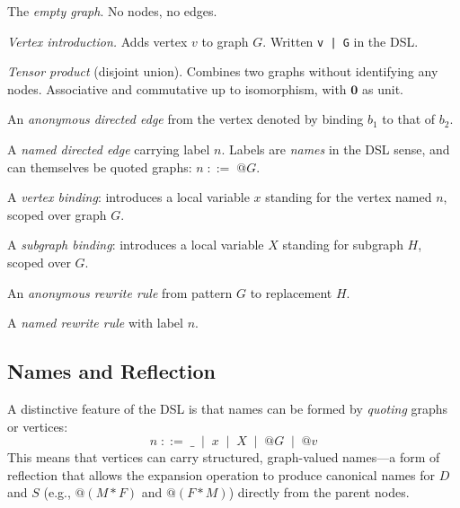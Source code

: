 \documentclass[11pt, a4paper]{article}
\theoremstyle{definition}
\theoremstyle{plain}
\theoremstyle{remark}
\newcommand{\GNil}{\mathbf{0}}
\newcommand{\tensor}{\mathbin{*}}
\begin{document}
\begin{description}[leftmargin=2em, style=nextline]
  \item[$\GNil$] The \emph{empty graph}.  No nodes, no edges.

  \item[$v \mid G$]  \emph{Vertex introduction.}  Adds vertex $v$ to graph $G$.
    Written \lstinline[style=dsl]{v | G} in the DSL.

  \item[$G \tensor H$] \emph{Tensor product} (disjoint union).  Combines two
    graphs without identifying any nodes.  Associative and commutative up to
    isomorphism, with $\GNil$ as unit.

  \item[$(b_1,\, b_2)$] An \emph{anonymous directed edge} from the vertex
    denoted by binding $b_1$ to that of $b_2$.

  \item[$n(b_1,\, b_2)$] A \emph{named directed edge} carrying label $n$.
    Labels are \emph{names} in the DSL sense, and can themselves be quoted
    graphs: $n \;{::=}\; @G$.

  \item[\texttt{let} $x = \langle n\rangle$ \texttt{in} $G$]
    A \emph{vertex binding}: introduces a local variable $x$ standing for the
    vertex named $n$, scoped over graph $G$.

  \item[\texttt{let} $X = H$ \texttt{in} $G$]
    A \emph{subgraph binding}: introduces a local variable $X$ standing for
    subgraph $H$, scoped over $G$.

  \item[\texttt{[= G H]}] An \emph{anonymous rewrite rule} from pattern $G$ to
    replacement $H$.

  \item[\texttt{n[= G H]}] A \emph{named rewrite rule} with label $n$.
\end{description}

\subsection{Names and Reflection}

A distinctive feature of the DSL is that names can be formed by \emph{quoting}
graphs or vertices:
\[
  n \;::=\; \_ \;\mid\; x \;\mid\; X \;\mid\; @G \;\mid\; @v
\]
This means that vertices can carry structured, graph-valued names---a form of
reflection that allows the expansion operation to produce canonical names for
$D$ and $S$ (e.g., $@(M \tensor F)$ and $@(F \tensor M)$) directly from the
parent nodes.
\end{document}
